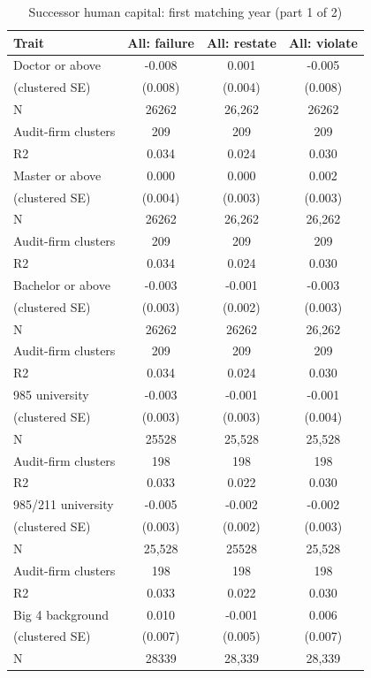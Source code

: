 \begin{table}[htbp]
\footnotesize
\centering
\caption{Successor human capital: first matching year (part 1 of 2)}
\begin{threeparttable}
\begin{tabular}{p{}ccc}
\toprule
Trait & All: failure & All: restate & All: violate \\
\midrule
Doctor or above & -0.008 & 0.001 & -0.005 \\
(clustered SE) & (0.008) & (0.004) & (0.008) \\
N & 26262 & 26,262 & 26262 \\
Audit-firm clusters & 209 & 209 & 209 \\
R2 & 0.034 & 0.024 & 0.030 \\
Master or above & 0.000 & 0.000 & 0.002 \\
(clustered SE) & (0.004) & (0.003) & (0.003) \\
N & 26262 & 26,262 & 26,262 \\
Audit-firm clusters & 209 & 209 & 209 \\
R2 & 0.034 & 0.024 & 0.030 \\
Bachelor or above & -0.003 & -0.001 & -0.003 \\
(clustered SE) & (0.003) & (0.002) & (0.003) \\
N & 26262 & 26262 & 26,262 \\
Audit-firm clusters & 209 & 209 & 209 \\
R2 & 0.034 & 0.024 & 0.030 \\
985 university & -0.003 & -0.001 & -0.001 \\
(clustered SE) & (0.003) & (0.003) & (0.004) \\
N & 25528 & 25,528 & 25,528 \\
Audit-firm clusters & 198 & 198 & 198 \\
R2 & 0.033 & 0.022 & 0.030 \\
985/211 university & -0.005 & -0.002 & -0.002 \\
(clustered SE) & (0.003) & (0.002) & (0.003) \\
N & 25,528 & 25528 & 25,528 \\
Audit-firm clusters & 198 & 198 & 198 \\
R2 & 0.033 & 0.022 & 0.030 \\
Big 4 background & 0.010 & -0.001 & 0.006 \\
(clustered SE) & (0.007) & (0.005) & (0.007) \\
N & 28339 & 28,339 & 28,339 \\

\end{tabular}
\end{threeparttable}
\end{table}
